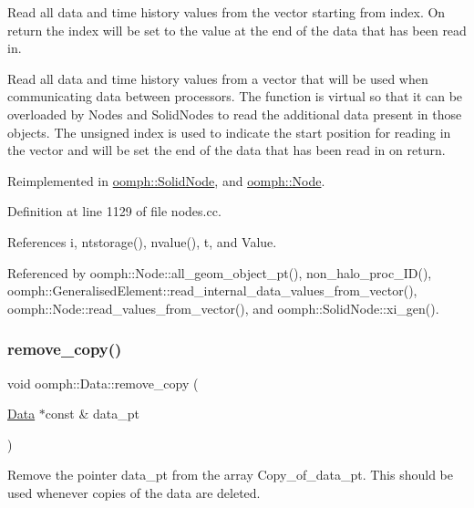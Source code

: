 Read all data and time history values from the vector starting from index. On return the index will be set to the value at the end of the data that has been read in. 

Read all data and time history values from a vector that will be used when communicating data between processors. The function is virtual so that it can be overloaded by Nodes and Solid\+Nodes to read the additional data present in those objects. The unsigned index is used to indicate the start position for reading in the vector and will be set the end of the data that has been read in on return. 

Reimplemented in \hyperlink{classoomph_1_1SolidNode_a8884dfe9e2808883e90c7f2822151784}{oomph\+::\+Solid\+Node}, and \hyperlink{classoomph_1_1Node_accb033ab8ed4f96331014f7c4cd131f9}{oomph\+::\+Node}.



Definition at line 1129 of file nodes.\+cc.



References i, ntstorage(), nvalue(), t, and Value.



Referenced by oomph\+::\+Node\+::all\+\_\+geom\+\_\+object\+\_\+pt(), non\+\_\+halo\+\_\+proc\+\_\+\+I\+D(), oomph\+::\+Generalised\+Element\+::read\+\_\+internal\+\_\+data\+\_\+values\+\_\+from\+\_\+vector(), oomph\+::\+Node\+::read\+\_\+values\+\_\+from\+\_\+vector(), and oomph\+::\+Solid\+Node\+::xi\+\_\+gen().

\mbox{\label{classoomph_1_1Data_a3fd7b4d0cc8ac713572f04ffda5a92c7}} 
\subsubsection{\texorpdfstring{remove\+\_\+copy()}{remove\_copy()}}
{\footnotesize\ttfamily void oomph\+::\+Data\+::remove\+\_\+copy (\begin{DoxyParamCaption}\item[{\hyperlink{classoomph_1_1Data}{Data} $\ast$const \&}]{data\+\_\+pt }\end{DoxyParamCaption})\hspace{0.3cm}{\ttfamily [private]}}



Remove the pointer data\+\_\+pt from the array Copy\+\_\+of\+\_\+data\+\_\+pt. This should be used whenever copies of the data are deleted. 

